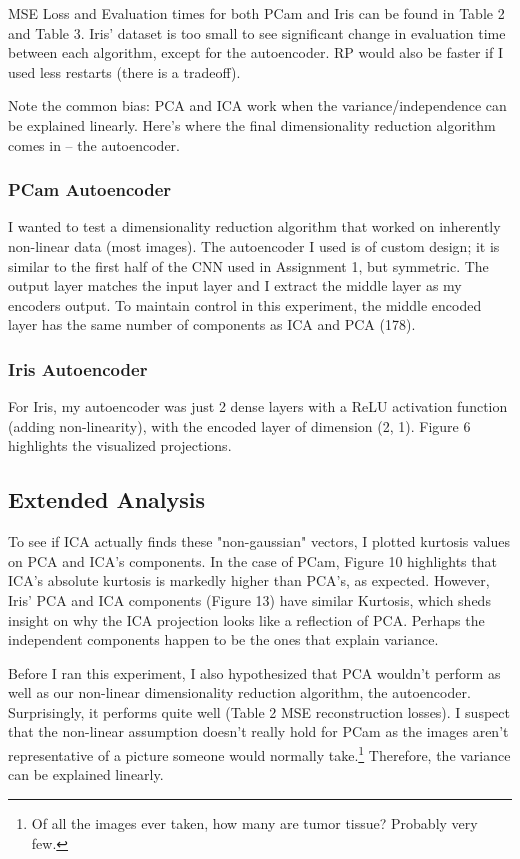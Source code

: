 \documentclass[letter]{article}
\begin{document}
MSE Loss and Evaluation times for both PCam and Iris can be found in Table 2 and Table 3. Iris' dataset is too small to see significant change in evaluation time between each algorithm, except for the autoencoder. RP would also be faster if I used less restarts (there is a tradeoff).

Note the common bias: PCA and ICA work when the variance/independence can be explained linearly. Here's where the final dimensionality reduction algorithm comes in -- the autoencoder. 

\subsubsection{PCam Autoencoder}
I wanted to test a dimensionality reduction algorithm that worked on inherently non-linear data (most images). The autoencoder I used is of custom design; it is similar to the first half of the CNN used in Assignment 1, but symmetric. The output layer matches the input layer and I extract the middle layer as my encoders output. To maintain control in this experiment, the middle encoded layer has the same number of components as ICA and PCA (178).

\subsubsection{Iris Autoencoder}
For Iris, my autoencoder was just 2 dense layers with a ReLU activation function (adding non-linearity), with the encoded layer of dimension (2, 1). Figure 6 highlights the visualized projections.

\subsection{Extended Analysis}
To see if ICA actually finds these "non-gaussian" vectors, I plotted kurtosis values on PCA and ICA's components. In the case of PCam, Figure 10 highlights that ICA's absolute kurtosis is markedly higher than PCA's, as expected. However, Iris' PCA and ICA components (Figure 13) have similar Kurtosis, which sheds insight on why the ICA projection looks like a reflection of PCA. Perhaps the independent components happen to be the ones that explain variance.

Before I ran this experiment, I also hypothesized that PCA wouldn't perform as well as our non-linear dimensionality reduction algorithm, the autoencoder. Surprisingly, it performs quite well (Table 2 MSE reconstruction losses). I suspect that the non-linear assumption doesn't really hold for PCam as the images aren't representative of a picture someone would normally take.\footnote{Of all the images ever taken, how many are tumor tissue? Probably very few.} Therefore, the variance can be explained linearly.
\end{document}
